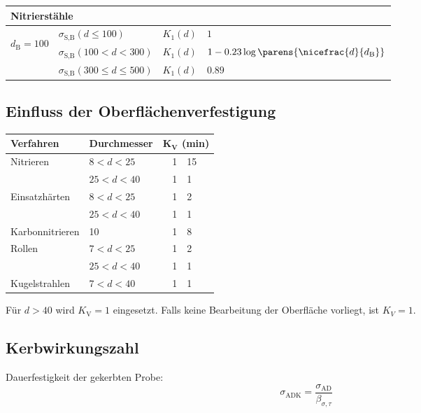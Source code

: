 \begin{center}
\begin{tabular}{l|lr@{$\:=\:$}l}
				\midrule \midrule
				\multicolumn{4}{l}{\textbf{Nitrierstähle}} \\
				\midrule
				\multirow{3}{*}{
				\begin{sideways}
					$d_\text{B} = 100$
				\end{sideways}
				} & $\sigma_\text{S,B}(d\leq 100)$ & $K_1(d)$ & $1$ \\
				& $\sigma_\text{S,B}(100 < d < 300)$ & $K_1(d)$ & $1-0.23\log\parens{\nicefrac{d}{d_\text{B}}}$ \\
				& $\sigma_\text{S,B}(300 \leq d \leq 500)$ & $K_1(d)$ & $0.89$ \\
				\bottomrule
			\end{tabular}
		\end{center}
	\subsection{Einfluss der Oberflächenverfestigung} %
		\begin{center}
			\begin{tabular}{llr@{.}l}
				\toprule
				\textbf{Verfahren} & \textbf{Durchmesser} & \multicolumn{2}{l}{$\boldsymbol{K_{\textbf{V}}}$ \textbf{(min)}} \\
				\midrule
				Nitrieren & $8 < d < 25$ & 1&15 \\
				& $25 < d < 40$ & 1&1 \\
				\midrule
				Einsatzhärten & $8 < d < 25$ & 1&2 \\
				 & $25 < d < 40$ & 1&1 \\
				\midrule
				Karbonnitrieren & 10 & 1&8 \\
				\midrule
				Rollen & $7<d<25$ & 1&2 \\
				 & $25<d<40$ & 1&1 \\
				\midrule
				Kugelstrahlen & $7<d<40$ & 1&1\\
				\bottomrule
			\end{tabular}
		\end{center}
		Für $d > 40$ wird $K_\text{V} = 1$ eingesetzt. Falls keine Bearbeitung der Oberfläche vorliegt, ist $K_V = 1$.
	\subsection{Kerbwirkungszahl} %
		Dauerfestigkeit der gekerbten Probe:
		\begin{equation*}
			\sigma_{\text{ADK}} = \frac{\sigma_{\text{AD}}}{\beta_{\sigma,\tau}}
		\end{equation*}
		
